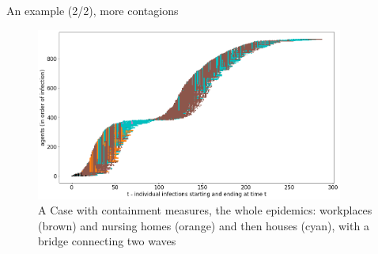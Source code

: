 \documentclass[8pt]{beamer}
\begin{document}
\begin{frame}{An example (1/2)}
\begin{figure}[H]
tions: workplaces (brown) and nursing homes (orange) strictly interweaving}
\label{workplacesNursingHomes}
\end{figure}
\end{frame}

\begin{frame}{An example (2/2), more contagions}

\begin{figure}[H]
\center
\includegraphics[width=0.9\textwidth]{with8a.png}%
\caption{A Case with containment measures, the whole epidemics: workplaces (brown) and nursing homes (orange) and then houses (cyan), with a bridge connecting two waves}
\label{workplacesNursingHomes}
\end{figure}


\end{frame}
\end{document}
